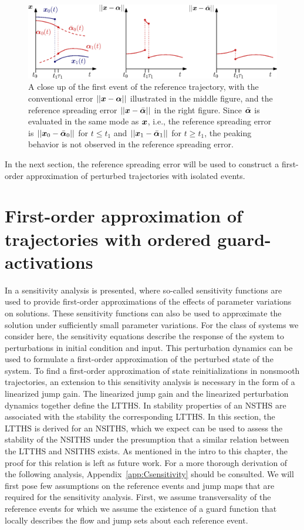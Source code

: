\documentclass[../DC2017114Bouma.tex]{subfiles}
\begin{document}
\begin{figure}[h]
\centering
\includegraphics[width=\textwidth]{refspreaderrors.eps}\caption{A close up of the  first event of the reference trajectory, with the conventional error $||{\boldsymbol{x}}-\boldsymbol{\alpha}||$ illustrated in the middle figure, and the reference spreading error $||{\boldsymbol{x}}-\bar{\boldsymbol{\alpha}}||$ in the right figure. Since $\bar{\boldsymbol{\alpha}}$ is evaluated in the same mode as ${\boldsymbol{x}}$, i.e., the reference spreading error is $||{\boldsymbol{x}}_0 - \bar{\boldsymbol{\alpha}}_0||$ for $t\leq t_1$ and $||{\boldsymbol{x}}_1 - \bar{\boldsymbol{\alpha}}_1||$ for $t\geq t_1$, the peaking behavior is not observed in the reference spreading error.}\label{fig:3refspreaderrors}
\end{figure}

In the next section, the reference spreading error will be used to construct a first-order approximation of perturbed trajectories with isolated events.

\section{First-order approximation of trajectories with ordered guard-activations}\label{sec:3approx}
In \cite{Khalil1996} a sensitivity analysis is presented, where so-called sensitivity functions are used to provide first-order approximations of the effects of parameter variations on solutions. These sensitivity functions can also be used to approximate the solution under sufficiently small parameter variations. For the class of systems we consider here, the sensitivity equations describe the response of the system to perturbations in initial condition and input. This perturbation dynamics can be used to formulate a first-order approximation of the perturbed state of the system. To find a first-order approximation of state reinitializations in nonsmooth trajectories, an extension to this sensitivity analysis is necessary in the form of a linearized jump gain. The linearized jump gain and the linearized perturbation dynamics together define the LTTHS. In \cite{Rijnen2017} stability properties of an NSTHS are associated with the stability the corresponding LTTHS. In this section, the LTTHS is derived for an NSITHS, which we expect can be used to assess the stability of the NSITHS under the presumption that a similar relation between the LTTHS and NSITHS exists. As mentioned in the intro to this chapter, the proof for this relation is left as future work. For a more thorough derivation of the following analysis, Appendix~\ref{app:Csensitivity} should be consulted. We will first pose few assumptions on the reference events and jump maps that are required for the sensitivity analysis. First, we assume transversality of the reference events for which we assume the existence of a guard function that locally describes the flow and jump sets about each reference event.
\end{document}
